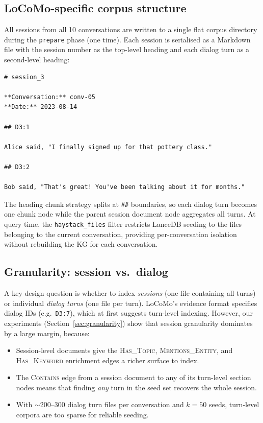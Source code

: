 \documentclass[11pt,a4paper]{article}
\begin{document}
\subsection{LoCoMo-specific corpus structure}

All sessions from all 10 conversations are written to a single flat corpus
directory during the \texttt{prepare} phase (one time).
Each session is serialised as a Markdown file with the session number as the
top-level heading and each dialog turn as a second-level heading:

\begin{lstlisting}
# session_3

**Conversation:** conv-05
**Date:** 2023-08-14

## D3:1

Alice said, "I finally signed up for that pottery class."

## D3:2

Bob said, "That's great! You've been talking about it for months."
\end{lstlisting}

The heading chunk strategy splits at \texttt{\#\#} boundaries, so each dialog
turn becomes one chunk node while the parent session document node aggregates
all turns.
At query time, the \texttt{haystack\_files} filter restricts LanceDB seeding
to the files belonging to the current conversation, providing per-conversation
isolation without rebuilding the KG for each conversation.

\subsection{Granularity: session vs.\ dialog}

A key design question is whether to index \emph{sessions} (one file containing
all turns) or individual \emph{dialog turns} (one file per turn).
LoCoMo's evidence format specifies dialog IDs (e.g.\ \texttt{D3:7}), which
at first suggests turn-level indexing.
However, our experiments (Section~\ref{sec:granularity}) show that session
granularity dominates by a large margin, because:

\begin{itemize}
  \item Session-level documents give the \textsc{Has\_Topic},
        \textsc{Mentions\_Entity}, and \textsc{Has\_Keyword} enrichment edges
        a richer surface to index.
  \item The \textsc{Contains} edge from a session document to any of its
        turn-level section nodes means that finding \emph{any} turn in the
        seed set recovers the whole session.
  \item With $\sim$200--300 dialog turn files per conversation and $k{=}50$
        seeds, turn-level corpora are too sparse for reliable seeding.
\end{itemize}
\end{document}
